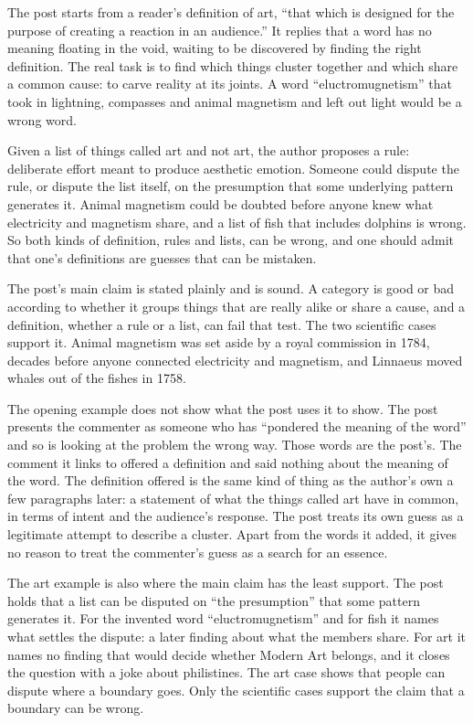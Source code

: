 \begin{afterword}
\summaryhead

The post starts from a reader's definition of art, ``that which is designed for the purpose of creating a reaction in an audience.'' It replies that a word has no meaning floating in the void, waiting to be discovered by finding the right definition. The real task is to find which things cluster together and which share a common cause: to carve reality at its joints. A word ``eluctromugnetism'' that took in lightning, compasses and animal magnetism and left out light would be a wrong word.

Given a list of things called art and not art, the author proposes a rule: deliberate effort meant to produce aesthetic emotion. Someone could dispute the rule, or dispute the list itself, on the presumption that some underlying pattern generates it. Animal magnetism could be doubted before anyone knew what electricity and magnetism share, and a list of fish that includes dolphins is wrong. So both kinds of definition, rules and lists, can be wrong, and one should admit that one's definitions are guesses that can be mistaken.

\responsehead

The post's main claim is stated plainly and is sound. A category is good or bad according to whether it groups things that are really alike or share a cause, and a definition, whether a rule or a list, can fail that test. The two scientific cases support it. Animal magnetism was set aside by a royal commission in 1784, decades before anyone connected electricity and magnetism, and Linnaeus moved whales out of the fishes in 1758.

The opening example does not show what the post uses it to show. The post presents the commenter as someone who has ``pondered the meaning of the word'' and so is looking at the problem the wrong way. Those words are the post's. The comment it links to offered a definition and said nothing about the meaning of the word. The definition offered is the same kind of thing as the author's own a few paragraphs later: a statement of what the things called art have in common, in terms of intent and the audience's response. The post treats its own guess as a legitimate attempt to describe a cluster. Apart from the words it added, it gives no reason to treat the commenter's guess as a search for an essence.

The art example is also where the main claim has the least support. The post holds that a list can be disputed on ``the presumption'' that some pattern generates it. For the invented word ``eluctromugnetism'' and for fish it names what settles the dispute: a later finding about what the members share. For art it names no finding that would decide whether Modern Art belongs, and it closes the question with a joke about philistines. The art case shows that people can dispute where a boundary goes. Only the scientific cases support the claim that a boundary can be wrong.


\end{afterword}
